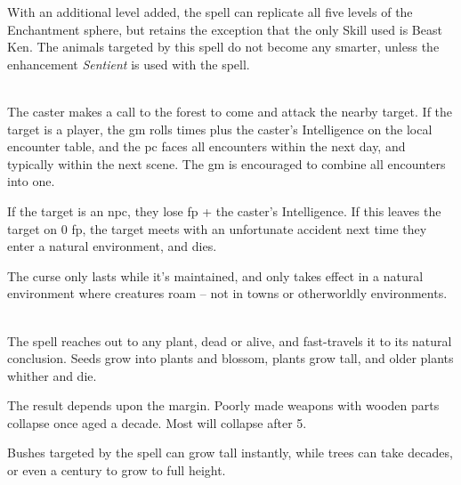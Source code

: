 \begin{multicols}{2}

With an additional level added, the spell can replicate all five levels of the Enchantment sphere, but retains the exception that the only Skill used is Beast Ken.
The animals targeted by this spell do not become any smarter, unless the enhancement \textit{Sentient} is used with the spell.

\spelllevel

\\
\label{forestsCall}%
The caster makes a call to the forest to come and attack the nearby target.  If the target is a player, the \gls{gm} rolls  times plus the caster's Intelligence on the local encounter table, and the \gls{pc} faces all encounters within the next day, and typically within the next scene.  The \gls{gm} is encouraged to combine all encounters into one.

If the target is an \gls{npc}, they lose  \gls{fp} + the caster's Intelligence.
If this leaves the target on 0 \gls{fp}, the target meets with an unfortunate accident next time they enter a natural environment, and dies.

The curse only lasts while it's maintained, and only takes effect in a natural environment where creatures roam -- not in towns or otherworldly environments.

\\
The spell reaches out to any plant, dead or alive, and fast-travels it to its natural conclusion.
Seeds grow into plants and blossom, plants grow tall, and older plants whither and die.

The result depends upon the margin.
Poorly made weapons with wooden parts collapse once aged a decade.
Most will collapse after 5.

Bushes targeted by the spell can grow tall instantly, while trees can take decades, or even a century to grow to full height.

\end{multicols}
